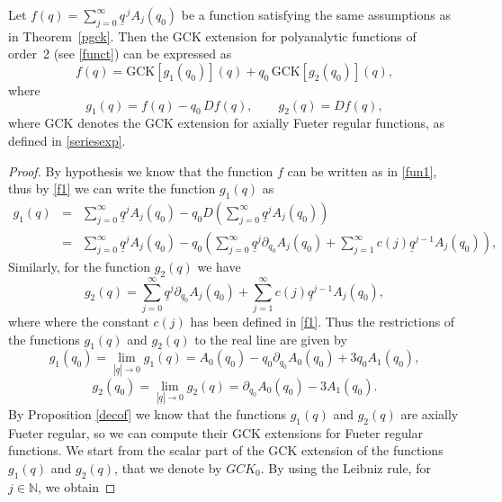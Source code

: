 \documentclass[10pt,a4paper]{amsart}
\begin{document}
\begin{proposition}
\label{decop}
	Let $f(q) = \sum_{j=0}^{\infty} \underline{q}^{\,j} A_j(q_0)$ be a function satisfying the same assumptions as in Theorem~\ref{pgck}. Then the GCK extension for polyanalytic functions of order~2 (see \eqref{funct}) can be expressed as
\begin{equation}
\label{Pgck}
f(q) = \mathrm{GCK}[g_1(q_0)](q) + q_0\, \mathrm{GCK}[g_2(q_0)](q),
\end{equation}
where
$$
g_1(q) = f(q) - q_0\, Df(q), \qquad g_2(q) = Df(q),
$$
where $\mathrm{GCK}$ denotes the GCK extension for axially Fueter regular functions, as defined in \eqref{seriesexp}.
\end{proposition}

\begin{proof}
By hypothesis we know that the function $f$ can be written as in \eqref{fun1}, thus by \eqref{f1} we can write the function $g_1(q)$ as
\begin{eqnarray*}
g_1(q)&=& \sum_{j=0}^\infty \underline{q}^j A_j(q_0)- q_0 D \left(\sum_{j=0}^\infty  \underline{q}^j A_j(q_0)\right)\\
&=&\sum_{j=0}^\infty \underline{q}^j A_j(q_0)- q_0 \left( \sum_{j=0}^\infty \underline{q}^j \partial_{q_0} A_j(q_0)+ \sum_{j=1}^\infty c(j) \underline{q}^{j-1} A_j(q_0)\right),
\end{eqnarray*}
Similarly, for the function $g_2(q)$ we have
$$ g_2(q)=\sum_{j=0}^\infty \underline{q}^j \partial_{q_0} A_j(q_0)+ \sum_{j=1}^\infty c(j) \underline{q}^{j-1} A_j(q_0),$$
where where the constant $c(j)$ has been defined in \eqref{f1}.
Thus the restrictions of the functions $g_1(q)$ and $g_2(q)$ to the real line are given by
\begin{equation}
\label{res1}
g_1(q_0)= \lim_{|\underline{q}| \to 0}g_1(q) =A_0(q_0)-q_0 \partial_{q_0} A_0(q_0)+3q_0 A_1(q_0),
\end{equation}
\begin{equation}
\label{res2}
g_2(q_0)=\lim_{|\underline{q}| \to 0} g_2(q)=\partial_{q_0} A_0(q_0)-3A_1(q_0).
\end{equation}
By Proposition \ref{decof} we know that the functions $g_1(q)$ and $g_2(q)$ are axially Fueter regular, so we can compute their GCK extensions for Fueter regular functions. We start from the scalar part of the GCK extension of the functions $g_1(q)$ and $g_2(q)$, that we denote by $GCK_0$. By using the Leibniz rule, for $j \in \mathbb{N}$, we obtain


\end{proof}
\end{document}
